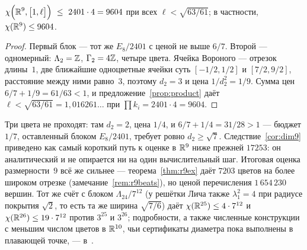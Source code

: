 \begin{keybox}
\begin{corollary}\label{cor:dim9}
$\displaystyle\chi\Bigl(\R^9,\bigl[1,\ell\bigr]\Bigr)\ \le\ 2401\cdot4=9604$
при всех $\ell<\sqrt{63/61}$; в частности, $\chi(\mathbb{R}^9)\le9604$.
\end{corollary}
\end{keybox}

\begin{proof}
Первый блок --- тот же $E_8/2401$ с ценой не выше $6/7$. Второй --- одномерный:
$\Lambda_2=\mathbb{Z}$, $\Gamma_2=4\mathbb{Z}$, четыре цвета. Ячейка Вороного --- отрезок
длины~$1$, две ближайшие одноцветные ячейки суть $[-1/2,1/2]$ и $[7/2,9/2]$,
расстояние между ними равно~$3$, поэтому $d_2=3$ и цена $1/d_2^2=1/9$. Сумма
цен $6/7+1/9=61/63<1$, и предложение~\ref{prop:product} даёт
$\ell<\sqrt{63/61}=1{,}016261\ldots$ при $\prod k_i=2401\cdot4=9604$.
\end{proof}

Три цвета не проходят: там $d_2=2$, цена $1/4$, и $6/7+1/4=31/28>1$ ---
бюджет $1/7$, оставленный блоком $E_8/2401$, требует ровно $d_2\ge\sqrt7$.
Следствие~\ref{cor:dim9} приведено как самый короткий путь к оценке в $\mathbb{R}^9$
ниже прежней $17253$: он аналитический и не опирается ни на один
вычислительный шаг. Итоговая оценка размерности~$9$ всё же сильнее ---
теорема~\ref{thm:r9ex} даёт $7203$ цветов на более широком отрезке
(замечание~\ref{rem:r9beats}), но ценой перечисления $1\,654\,230$ вершин. Тот же счёт с блоком
$\Lambda_{24}/7^{12}$ (у решётки Лича также $\lambda_1^2=4$ при радиусе
покрытия $\sqrt2$, то есть та же ширина $\sqrt{7/6}$) даёт
$\chi(\mathbb{R}^{25})\le4\cdot7^{12}$ и $\chi(\mathbb{R}^{26})\le19\cdot7^{12}$ против
$3^{25}$ и $3^{26}$; подробности, а также численные конструкции с меньшим
числом цветов в $\mathbb{R}^{10}$, чьи сертификаты диаметра пока выполнены в
плавающей точке, --- в~\cite{Widths}.
